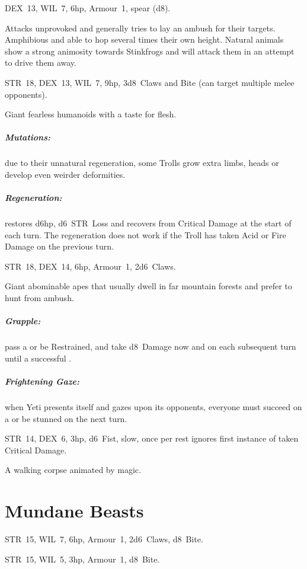 \documentclass[itdr]{subfiles}
\begin{document}
\vfill

DEX~13, WIL~7, 6hp, Armour~1, spear (d8).

Attacks unprovoked and generally tries to lay an ambush for their targets. Amphibious and able to hop several times their own height. Natural animals show a strong animosity towards Stinkfrogs and will attack them in an attempt to drive them away.

\vfill

STR~18, DEX~13, WIL~7, 9hp, 3d8~Claws and Bite (can target multiple melee opponents).

Giant fearless humanoids with a taste for flesh.

\subparagraph{Mutations:} due to their unnatural regeneration, some Trolls grow extra limbs, heads or develop even weirder deformities.

\subparagraph{Regeneration:} restores d6hp, d6~STR~Loss and recovers from Critical Damage at the start of each turn. The regeneration does not work if the Troll has taken Acid or Fire Damage on the previous turn.

\vfill

STR~18, DEX~14, 6hp, Armour~1, 2d6~Claws.

Giant abominable apes that usually dwell in far mountain forests and prefer to hunt from ambush.

\subparagraph{Grapple:} pass a  or be Restrained, and take d8~Damage now and on each subsequent turn until a successful .

\subparagraph{Frightening Gaze:} when Yeti presents itself and gazes upon its opponents, everyone must succeed on a  or be stunned on the next turn.

\vfill

STR~14, DEX~6, 3hp, d6~Fist, slow, once per rest \mbox{ignores} first instance of taken Critical Damage.

A walking corpse animated by magic.


\vfill
\break

\section{Mundane Beasts}

STR~15, WIL~7, 6hp, Armour~1, 2d6~Claws, d8~Bite.

\vfill

STR~15, WIL~5, 3hp, Armour~1, d8~Bite.
\end{document}
